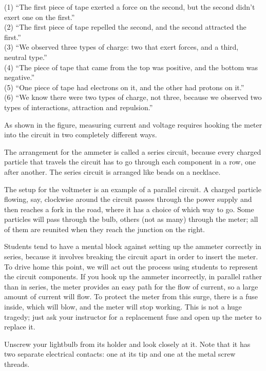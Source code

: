 (1) ``The first piece of tape exerted a force on the second,
but the second didn't exert one on the first.''\\
(2) ``The first piece of tape repelled the second, and the
second attracted the first.''\\
(3) ``We observed three types of charge: two that exert
forces, and a third, neutral type.''\\
(4) ``The piece of tape that came from the top was positive,
and the bottom was negative.''\\
(5) ``One piece of tape had electrons on it, and the other
had protons on it.''\\
(6) ``We know there were two types of charge, not three,
because we observed two types of interactions, attraction
and repulsion.''


As shown in the figure, measuring current and voltage requires
hooking the meter into the circuit in two completely different
ways.


The arrangement for the ammeter is called a series circuit,
because every charged particle that travels the circuit has
to go through each component in a row, one after another.
The series circuit is arranged like beads on a necklace.

The setup for the voltmeter is an example of a parallel
circuit. A charged particle flowing, say, clockwise
around the circuit passes through the power supply and
then reaches a fork in the road, where it has a choice
of which way to go. Some particles will pass through the
bulb, others (not as many) through the meter; all of them
are reunited when they reach the junction on the right.

Students tend to have a mental block against setting up the
ammeter correctly in series, because it involves breaking the circuit
apart in order to insert the meter. To drive home this point,
we will act out the process using students to represent
the circuit components. If you hook up the ammeter incorrectly,
in parallel rather than in series, the meter provides an easy path for the flow
of current, so a large amount of current will flow. To protect the meter
from this surge, there is a fuse inside, which will blow, and the meter
will stop working. This is not a huge tragedy;
just ask your instructor for a replacement fuse and open up the
meter to replace it.

Unscrew your lightbulb from its holder and look closely at it. Note
that it has two separate electrical contacts: one at its tip and
one at the metal screw threads.

